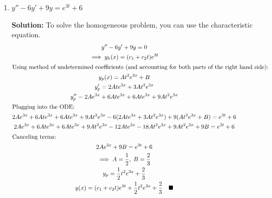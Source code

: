 \documentclass[letterpaper, fontsize=11pt]{scrartcl} %
\numberwithin{equation}{section} %
\numberwithin{figure}{section} %
\numberwithin{table}{section} %
\begin{document}
\begin{enumerate}
\begin{enumerate}
\item $y'' -6y'+9y=e^{3t} +6$
\par \textbf{Solution:} To solve the homogeneous problem, you can use the characteristic equation. 
\begin{gather*}
y'' -6y' +9y= 0\\
\implies y_h(x) = (c_1 +c_2t)e^{3t}\\
\intertext{Using method of undetermined coefficients (and accounting for both parts of the right hand side):}
y_p(x) = At^2 e^{3x} + B\\
y_p' = 2Ate^{3x} + 3At^2e^{3x}\\
y_p'' = 2Ae^{3x} + 6Ate^{3x}+ 6Ate^{3x} + 9At^2e^{3x}\\
\intertext{Plugging into the ODE:}
2Ae^{3x} + 6Ate^{3x}+ 6Ate^{3x} + 9At^2e^{3x} -6(2Ate^{3x} + 3At^2e^{3x})+9(At^2 e^{3x} + B)=e^{3t} +6\\
2Ae^{3x} + 6Ate^{3x}+ 6Ate^{3x} + 9At^2e^{3x} -12Ate^{3x} -18At^2e^{3x}+9At^2 e^{3x} + 9B=e^{3t} +6 \\
\intertext{Canceling terms:}
2Ae^{3x} + 9B=e^{3t} +6 \\
\implies A = \frac{1}{2},\; B = \frac{2}{3} \\
y_p = \frac{1}{2}t^2e^{3x} + \frac{2}{3} \\
y(x) = (c_1 +c_2t)e^{3t} +  \frac{1}{2}t^2e^{3x} + \frac{2}{3} \quad\blacksquare
\end{gather*}


\end{enumerate}
\end{enumerate}
\end{document}
